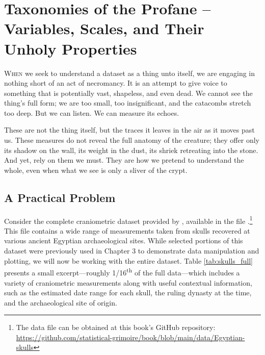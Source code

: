 \chapter{Taxonomies of the Profane – Variables, Scales, and Their Unholy Properties}

\IMFellEnglish
\lettrine[lines=5, realheight]{W}{hen} we seek to understand a dataset as a thing unto itself, we are engaging in nothing short of an act of necromancy. It is an attempt to give voice to something that is potentially vast, shapeless, and even dead. We cannot see the thing's full form; we are too small, too insignificant, and the catacombs stretch too deep. But we can listen. We can measure its echoes. 

These are not the thing itself, but the traces it leaves in the air as it moves past us. These measures do not reveal the full anatomy of the creature; they offer only its shadow on the wall, its weight in the dust, its shriek retreating into the stone. And yet, rely on them we must. They are how we pretend to understand the whole, even when what we see is only a sliver of the crypt.

\normalfont

\section{A Practical Problem}

Consider the complete craniometric dataset provided by  \textcite{Thomson1905}, available in the file .\footnote{The data file can be obtained at this book's GitHub repository: \url{https://github.com/statistical-grimoire/book/blob/main/data/Egyptian-skulls}} This file contains a wide range of measurements taken from skulls recovered at various ancient Egyptian archaeological sites. While selected portions of this dataset were previously used in Chapter 3 to demonstrate data manipulation and plotting, we will now be working with the entire dataset. Table \ref{tab:skulls_full} presents a small excerpt—roughly 1/16\textsuperscript{th} of the full data—which includes a variety of craniometric measurements along with useful contextual information, such as the estimated date range for each skull, the ruling dynasty at the time, and the archaeological site of origin.

